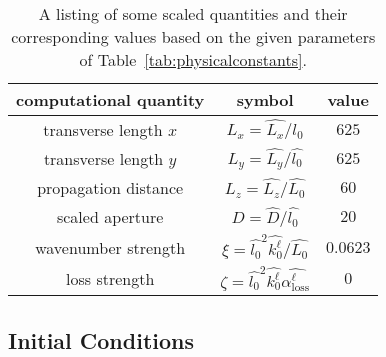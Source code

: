 \documentclass[9pt,twocolumn,twoside]{osajnl}
\begin{document}
\begin{table}[htp]
	\centering \vspace*{-3mm}
	\caption{A listing of some scaled quantities and their corresponding values based on the given parameters of 
	Table~\ref{tab:physicalconstants}.}\label{tab:scaledvars}
	\begin{tabular}{ccc}
		\hline
		computational quantity 	& symbol & value \\
		\hline
		transverse length $x$ 	& $L_{x} = \widehat{L_{x}} /\widehat{l_{0}}$ 			& $625$ \\ 
		transverse length $y$ 	& $L_{y} = \widehat{L_{y}} / \widehat{l_{0}}$ 			& $625$ \\ 
		propagation distance 	& $L_{z} = \widehat{L_{z}} / \widehat{L_{0}}$ 			& $60$ \\
		scaled aperture 		& $D = \widehat{D} / \widehat{l_{0}}$ 					& $20$ \\
		wavenumber strength		& $\xi = \widehat{l_{0}}^{2} \widehat{k_{0}^{\ell}} / \widehat{L_{0}}$																				& $0.0623$ \\

		loss strength			& $\zeta = \widehat{l_{0}}^{2} \widehat{k_{0}^{\ell}} \widehat{\alpha_{\text{loss}}^{\ell}}$										& $0$ \\
		\hline
	\end{tabular}
\end{table}


\subsection{Initial Conditions}
\end{document}
